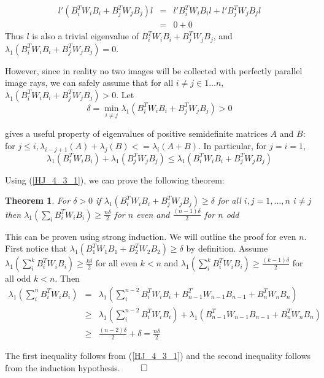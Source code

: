\documentclass[10pt]{amsart}
\newcommand{\btwbi}{B^T_iW_iB_i}
\newcommand{\btwbj}{B^T_jW_jB_j}
\newtheorem{theorem}{Theorem}
\begin{document}
\begin{eqnarray*}
l'(\btwbi+\btwbj)l & = & l'\btwbi l + l'\btwbj l \\
                   & = & 0 + 0
\end{eqnarray*}
Thus $l$ is also a trivial eigenvalue of $\btwbi+\btwbj$, and $\lambda_1(\btwbi+\btwbj)=0$.

However, since in reality no two images will be collected with perfectly
parallel image rays, we can safely assume that for all $i\ne j\in 1\ldots n$,
$\lambda_1(\btwbi+\btwbj)>0$. Let 
\begin{equation}\label{w_assumption_eq}
\delta = \min_{i\ne j}\lambda_1(\btwbi+\btwbj) > 0
\end{equation}

\cite{H_AND_J} gives a useful property of eigenvalues of positive semidefinite
matrices $A$ and $B$: for $j\le i,
\lambda_{i-j+1}(A)+\lambda_j(B)<=\lambda_i(A+B)$.
In particular, for $j=i=1$,
\begin{equation}\label{HJ_4_3_1}
\lambda_1(\btwbi)+\lambda_1(\btwbj) \le \lambda_1(\btwbi+\btwbj)
\end{equation}

Using (\ref{HJ_4_3_1}), we can prove the following theorem:

\begin{theorem} \label{theorem_1}
	 For $\delta > 0$ if $\lambda_1(B^T_iW_iB_i + B^T_jW_jB_j) \geq \delta$
         for all $i, j = 1, \dots, n$ $i \ne j$ then $\lambda_1(\sum_i
         B^T_iW_iB_i) \geq \frac{n\delta}{2}$ for $n$ even and
         $\frac{(n-1)\delta}{2}$ for $n$ odd
\end{theorem}

This can be proven using strong induction.  We will outline the proof for even
$n$.  First notice that $\lambda_1(B^T_1W_1B_1 + B^T_2W_2B_2) \geq \delta$ by
definition.  Assume $\lambda_1(\sum^k_i B^T_iW_iB_i) \geq \frac{k\delta}{2}$ for
all even $k < n$ and $\lambda_1(\sum^k_i B^T_iW_iB_i) \geq
\frac{(k-1)\delta}{2}$ for all odd $k < n$.  Then
\begin{eqnarray*}
\lambda_1(\sum^n_iB^T_iW_iB_i) &=&\lambda_1(\sum^{n-2}_i B^T_iW_iB_i + B^T_{n-1}W_{n-1}B_{n-1} +  B^T_{n}W_{n}B_{n})\\
&\geq&\lambda_1(\sum^{n-2}_i B^T_iW_iB_i) +  \lambda_1(B^T_{n-1}W_{n-1}B_{n-1} + B^T_{n}W_{n}B_{n})\\
&\geq&\frac{(n-2)\delta}{2} + \delta = \frac{n\delta}{2}
\end{eqnarray*}

The first inequality follows from (\ref{HJ_4_3_1}) and the second
inequality follows from the induction hypothesis. $\qed$
\end{document}
